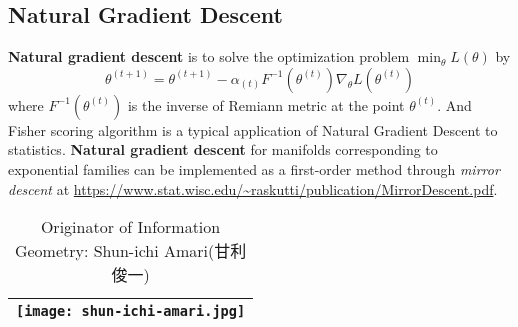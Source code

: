 \documentclass[titlestyle=hang,11pt]{elegantbook}
\begin{document}
%

\subsection{Natural Gradient Descent}

\textbf{Natural gradient descent} is to solve the optimization problem $\min_{\theta} L(\theta)$ by
$$ \theta^{(t+1)}=\theta^{(t+1)}-\alpha_{(t)}F^{-1}(\theta^{(t)})\nabla_{\theta}L(\theta^{(t)}) $$
where $F^{-1}(\theta^{(t)})$ is the inverse of Remiann metric at the point $\theta^{(t)}$.
And Fisher scoring algorithm is a typical application of Natural Gradient Descent to statistics.
\textbf{Natural gradient descent} for manifolds corresponding to
exponential families can be implemented as a first-order method through \emph{mirror descent} at \url{https://www.stat.wisc.edu/~raskutti/publication/MirrorDescent.pdf}.

\begin{table}[h]
	\centering
	\caption{Originator of Information Geometry: Shun-ichi Amari(甘利 俊一)}
	\begin{tabular}{|c|}
		\hline
		\texttt{[image: shun-ichi-amari.jpg]}  \\
		\hline
	\end{tabular}
\end{table}

\end{document}
